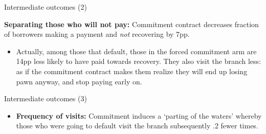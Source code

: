 \documentclass[8pt]{beamer}
\begin{document}
\begin{frame}{Intermediate outcomes (2)}

\begin{table}[H]
\caption{Intermediate outcomes}
\begin{center}
\footnotesize{}
\end{center}
\end{table}

   \vfill \item  \textbf{Separating those who will not pay:} Commitment contract decreases fraction of borrowers making a payment and \textit{not} recovering by 7pp.
    \begin{itemize}
        \item Actually, among those that default, those in the forced commitment arm are 14pp less likely to have paid towards recovery. They also visit the branch less: as if the commitment contract makes them realize they will end up losing pawn anyway, and stop paying early on.
    \end{itemize}
\end{frame}


\begin{frame}{Intermediate outcomes (3)}

    \begin{table}[H]
\caption{Intermediate outcomes}
\begin{center}
\footnotesize{}
\end{center}
\end{table}
\vfill
 \begin{itemize}
     \item \vfill \textbf{Frequency of visits:} Commitment induces a `parting of the waters' whereby those who were going to default visit the branch subsequently .2 fewer times.
\end{itemize}
\end{frame}





     
\end{document}
